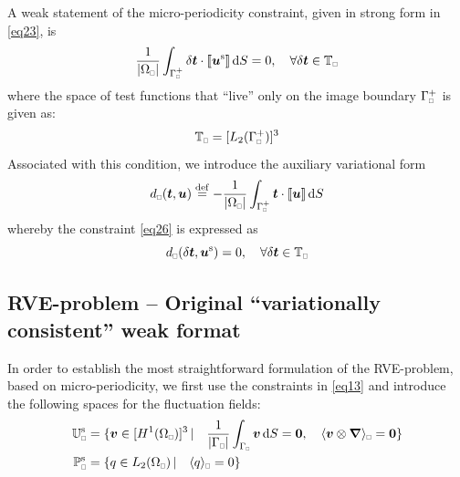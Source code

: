 \documentclass{bmcart}
\newcommand{\eqtref}[1]{\eqref{#1}}
\DeclarePairedDelimiter{\homgen}{\langle}{\rangle_\rve}
\DeclarePairedDelimiter{\jmp}{[\![}{]\!]}
\newcommand{\volume}{|\Omega_\rve|}
\newcommand{\rve}{
  {\mathchoice
   {\mbox{\scalebox{0.67}{$\Box$}}}
   {\mbox{\scalebox{0.67}{$\Box$}}}
   {\mbox{\scalebox{0.5}{$\Box$}}}
   {\mbox{\scalebox{0.375}{$\Box$}}}
  }
}
\begin{document}
A weak statement of the micro-periodicity constraint, given in strong form in \eqtref{eq23}, is
\begin{equation}
    \frac{1}{\volume}\int_{\Gamma_\rve^+} \delta \ta{t} \cdot \jmp{\ta{u}^\fluct} \dif S = 0,
    \quad \forall \delta \ta{t}\in\set{T}_\rve
\label{eq26}
\end{equation}
where the space of test functions that ``live'' only on the image boundary $\Gamma_\rve^+$ is given as:
\begin{equation}
    \set{T}_\rve = [L_2(\Gamma_\rve^+)]^{3}
\label{eq25a}
\end{equation}
Associated with this condition, we introduce the auxiliary variational form
\begin{equation}
    d_\rve(\ta{t},\ta{u}) \defeq
    - \frac{1}{\volume}\int_{\Gamma_\rve^+} \ta{t} \cdot \jmp{\ta{u}} \dif S
\label{eq27}
\end{equation}
whereby the constraint \eqtref{eq26} is expressed as
\begin{equation}
    d_\rve(\delta\ta{t},\ta{u}^\fluct) = 0, \quad \forall \delta \ta{t}\in\set{T}_\rve
\label{eq27a}
\end{equation}

\subsection{RVE-problem -- Original ``variationally consistent'' weak format}
\label{sec:original_rve}

In order to establish the most straightforward formulation of the RVE-problem, based on micro-periodicity, we first use the constraints in \eqtref{eq13} and introduce the following spaces for the fluctuation fields:
\begin{align}
    \set{U}_\rve^\fluct &= \{\ta{v}\in [H^1(\Omega_\rve)]^{3} \,| \quad \frac{1}{|\Gamma_\rve|}\int_{\Gamma_\rve} \ta{v} \dif S = \ta 0, \quad
    \homgen{ \ta{v}\outerp\diff } = \ta{0} \}
\label{eq28a} \\
    \set{P}_\rve^\fluct &= \{q\in L_2(\Omega_\rve) \,| \quad \homgen{q} = 0 \}
\label{eq28b}
\end{align}
\end{document}
